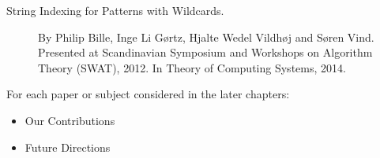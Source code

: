 \begin{description}
    \item[String Indexing for Patterns with Wildcards.] By Philip Bille, Inge Li Gørtz, Hjalte Wedel Vildhøj and Søren Vind. Presented at Scandinavian Symposium and Workshops on Algorithm Theory (SWAT), 2012. In Theory of Computing Systems, 2014. 
\end{description}

For each paper or subject considered in the later chapters:
\begin{itemize}
    \item Our Contributions
    \item Future Directions
\end{itemize}

